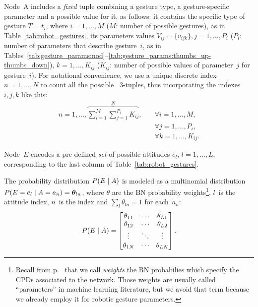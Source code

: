 Node~A includes a \emph{fixed} \gestparval{} tuple combining a gesture type, a gesture-specific parameter and a possible value for it, as follows: it contains the specific type of gesture $T = t_i$, where $i = 1, \ldots, M$ ($M$: number of possible gestures), as in Table~\ref{tab:robot_gestures}, its parameters values $V_{ij} = \{ v_{ijk} \}, j = 1, \ldots, P_i$ ($P_i$: number of parameters that describe gesture~$i$, as in Tables~\ref{tab:gesture_params:nod}--\ref{tab:gesture_params:thumbs_up-thumbs_down}), $k = 1, \ldots, K_{ij}$ ($K_{ij}$: number of possible values of parameter~$j$ for gesture~$i$). For notational convenience, we use a unique discrete index~$n=1, \ldots, N$ to count all the possible \gestparval{}~$3$-tuples, thus incorporating the indexes~$i, j, k$ like this:
\begin{equation} \label{eq:gestparval_index}
\begin{split}
n = 1, \ldots, \overbrace{\sum_{i=1}^M \sum_{j=1}^{P_i} K_{ij}}^N, \quad & \forall i=1,\ldots,M, \\
                                                                         & \forall j=1,\ldots,P_i, \\
                                                                         & \forall k=1,\ldots,K_{ij}.
\end{split}
\end{equation}

Node~$E$ encodes a pre-defined \emph{set} of possible attitudes $e_l$, $l = 1, \ldots, L$, corresponding to the last column of Table~\ref{tab:robot_gestures}.

The probability distribution $P(E \mid A)$ is modeled as a multinomial distribution $P(E = e_l \mid A = a_n) = \bm{\theta}_{ln}$, where $\theta$ are the \acl{BN} probability weights\footnote{Recall from p.~\pageref{terminology_parameter_weight} that we call \emph{weights} the \acl{BN} probabilies which specify the \acp{CPD} associated to the network. Those weights are usually called ``parameters'' in machine learning literature, but we avoid that term because we already employ it for robotic gesture parameters.}, $l$~is the attitude index, $n$~is the \gestparval{} index and $\sum_l \theta_{ln} = 1$ for each~$a_n$:
\begin{equation} \label{eq:gestatt_multinomial}
P(E \mid A) =
              \begin{bmatrix}
              \theta_{11} & \cdots & \theta_{L1} \\
              \theta_{12} & \cdots & \theta_{L2} \\
              \vdots & \ddots & \vdots \\
              \theta_{1N} & \cdots & \theta_{LN}
              \end{bmatrix}.
\end{equation}

